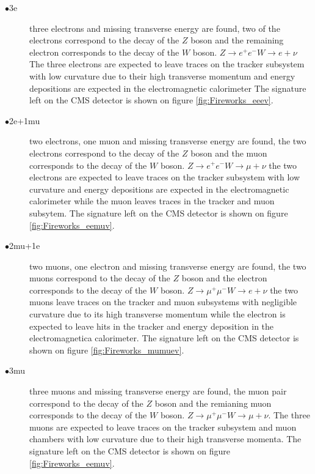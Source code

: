 \begin{description}
\item[$\bullet$3e] three electrons and missing transverse energy are found, two of the
  electrons correspond to the decay of the $Z$ boson and the remaining electron corresponds
  to the decay of the $W$ boson. $Z\rightarrow e^{+}e^{-} W\rightarrow e+\nu$
  The three electrons are expected to leave traces on the
  tracker subsystem with low curvature due to their high transverse momentum and
  energy depositions are expected in the electromagnetic calorimeter
  The signature left on the CMS detector is shown on figure \ref{fig:Fireworks_eeev}.
\item[$\bullet$2e+1mu] two electrons, one muon and missing transverse energy are found,
  the two electrons correspond to the decay of the $Z$ boson and the muon corresponds to the
  decay of the $W$ boson. $Z\rightarrow e^{+}e^{-} W\rightarrow \mu+\nu$ the two electrons are
  expected to leave traces on the tracker subsystem with low curvature and energy
  depositions are expected in the electromagnetic calorimeter while the muon leaves
  traces in the tracker and muon subsytem. The signature left on the CMS
  detector is shown on figure \ref{fig:Fireworks_eemuv}.
\item[$\bullet$2mu+1e] two muons, one electron and missing transverse energy are found,
  the two muons correspond to the decay of the $Z$ boson and the electron corresponds to the
  decay of the $W$ boson. $Z\rightarrow \mu^{+}\mu^{-} W\rightarrow e+\nu$ the two
  muons leave traces on the tracker and muon subsystems with negligible curvature due
  to its high transverse momentum while the electron is expected to leave hits in
  the tracker and energy deposition in the electromagnetica calorimeter.
  The signature left on the CMS detector is shown on figure \ref{fig:Fireworks_mumuev}.
\item[$\bullet$3mu] three muons and missing transverse energy are found, the muon pair
  correspond to the decay of the $Z$ boson and the remianing muon corresponds
  to the decay of the $W$ boson. $Z\rightarrow \mu^{+}\mu^{-} W\rightarrow \mu+\nu$.
  The three muons are expected to leave traces on the tracker subsystem and muon chambers
  with low curvature due to their high transverse momenta. The signature
  left on the CMS detector is shown on figure \ref{fig:Fireworks_eemuv}.
\end{description}

